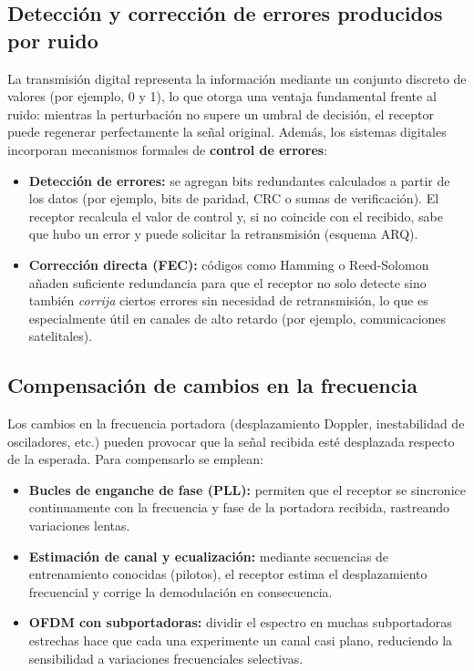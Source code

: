 \documentclass[12pt,a4paper]{article}
\begin{document}
\subsection{Detección y corrección de errores producidos por ruido}

La transmisión digital representa la información mediante un conjunto discreto de valores (por ejemplo, 0 y 1), lo que otorga una ventaja fundamental frente al ruido: mientras la perturbación no supere un umbral de decisión, el receptor puede regenerar perfectamente la señal original. Además, los sistemas digitales incorporan mecanismos formales de \textbf{control de errores}:

\begin{itemize}
  \item \textbf{Detección de errores:} se agregan bits redundantes calculados a partir de los datos (por ejemplo, bits de paridad, CRC o sumas de verificación). El receptor recalcula el valor de control y, si no coincide con el recibido, sabe que hubo un error y puede solicitar la retransmisión (esquema ARQ).
  \item \textbf{Corrección directa (FEC):} códigos como Hamming o Reed-Solomon añaden suficiente redundancia para que el receptor no solo detecte sino también \emph{corrija} ciertos errores sin necesidad de retransmisión, lo que es especialmente útil en canales de alto retardo (por ejemplo, comunicaciones satelitales).
\end{itemize}

\subsection{Compensación de cambios en la frecuencia}

Los cambios en la frecuencia portadora (desplazamiento Doppler, inestabilidad de osciladores, etc.) pueden provocar que la señal recibida esté desplazada respecto de la esperada. Para compensarlo se emplean:

\begin{itemize}
  \item \textbf{Bucles de enganche de fase (PLL):} permiten que el receptor se sincronice continuamente con la frecuencia y fase de la portadora recibida, rastreando variaciones lentas.
  \item \textbf{Estimación de canal y ecualización:} mediante secuencias de entrenamiento conocidas (pilotos), el receptor estima el desplazamiento frecuencial y corrige la demodulación en consecuencia.
  \item \textbf{OFDM con subportadoras:} dividir el espectro en muchas subportadoras estrechas hace que cada una experimente un canal casi plano, reduciendo la sensibilidad a variaciones frecuenciales selectivas.
\end{itemize}
\end{document}
